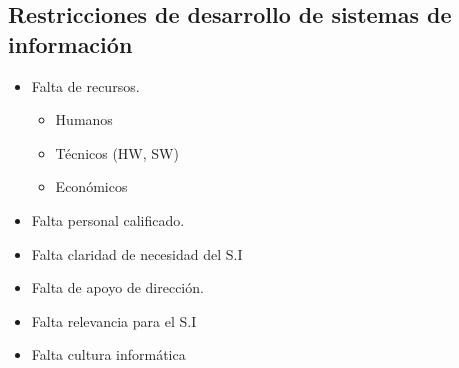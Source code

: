 \documentclass{templateNote}
\begin{document}
\subsection{Restricciones de desarrollo de sistemas de información}
\begin{itemize}
    \item Falta de recursos.
    \begin{itemize}
        \item Humanos
        \item Técnicos (HW, SW)
        \item Económicos
    \end{itemize}
    \item Falta personal calificado.
    \item Falta claridad de necesidad del S.I
    \item Falta de apoyo de dirección.
    \item Falta relevancia para el S.I
    \item Falta cultura informática
\end{itemize}
\newpage
\end{document}
